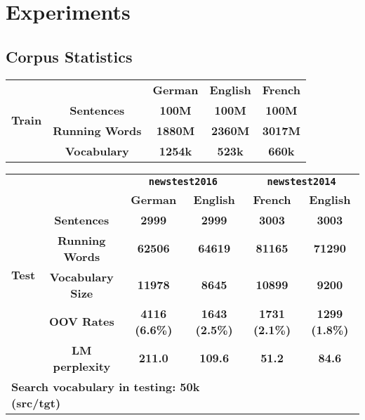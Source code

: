 \chapter{Experiments}

\section{Corpus Statistics}
\begin{table}[H]
	\centering
	\begin{tabular}{c|c|c|c|c}
		\hline
		\multirow{4}{*}{\textbf{Train}} & \textbf{}              & \textbf{German} & \textbf{English} & \textbf{French} \\ \cline{2-5} 
		& \textbf{Sentences}     & \textbf{100M}   & \textbf{100M}    & \textbf{100M}   \\ \cline{2-5} 
		& \textbf{Running Words} & \textbf{1880M}  & \textbf{2360M}   & \textbf{3017M}  \\ \cline{2-5} 
		& \textbf{Vocabulary}    & \textbf{1254k}  & \textbf{523k}    & \textbf{660k}   \\ \hline
	\end{tabular}
	
\end{table}

\begin{table}[H]
	\centering
	
	\begin{tabular}{c|c|c|c|c|c}
		\hline
		\multirow{7}{*}{\textbf{Test}} & \textbf{}                      & \multicolumn{2}{c|}{\textbf{\texttt{newstest2016}}}    & \multicolumn{2}{c}{\textbf{\texttt{newstest2014}}}    \\ \cline{3-6} 
		& \multicolumn{1}{l|}{\textbf{}} & \textbf{German}       & \textbf{English}      & \textbf{French}       & \textbf{English}      \\ \cline{2-6} 
		& \textbf{Sentences}             & \textbf{2999}         & \textbf{2999}         & \textbf{3003}         & \textbf{3003}         \\ \cline{2-6} 
		& \textbf{Running Words}         & \textbf{62506}        & \textbf{64619}        & \textbf{81165}        & \textbf{71290}        \\ \cline{2-6} 
		& \textbf{Vocabulary Size}       & \textbf{11978}        & \textbf{8645}         & \textbf{10899}        & \textbf{9200}         \\ \cline{2-6} 
		& \textbf{OOV Rates}             & \textbf{4116 (6.6\%)} & \textbf{1643 (2.5\%)} & \textbf{1731 (2.1\%)} & \textbf{1299 (1.8\%)} \\ \cline{2-6} 
		& \textbf{LM perplexity}         & \textbf{211.0}        & \textbf{109.6}        & \textbf{51.2}         & \textbf{84.6}         \\ \hline
		\multicolumn{4}{l}{\textbf{Search vocabulary in testing: 50k (src/tgt)}} \\
		
	\end{tabular}
\end{table}
